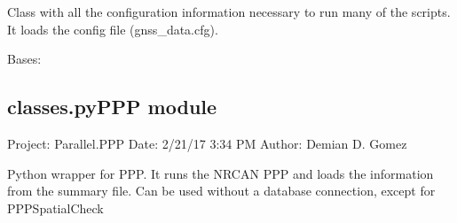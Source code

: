 \documentclass[letterpaper,10pt,english]{sphinxmanual}
\begin{document}
\sphinxAtStartPar
Class with all the configuration information necessary to run many of the
scripts. It loads the config file (gnss\_data.cfg).

\begin{fulllineitems}
\label{\detokenize{classes:classes.pyOptions.ReadOptions}}
\pysigstartsignatures
{}
\pysigstopsignatures
\sphinxAtStartPar
Bases: 

\end{fulllineitems}



\subsection{classes.pyPPP module}
\label{\detokenize{classes:module-classes.pyPPP}}\label{\detokenize{classes:classes-pyppp-module}}
\sphinxAtStartPar
Project: Parallel.PPP
Date: 2/21/17 3:34 PM
Author: Demian D. Gomez

\sphinxAtStartPar
Python wrapper for PPP. It runs the NRCAN PPP and loads the information from
the summary file. Can be used without a database connection, except for
PPPSpatialCheck
\end{document}
